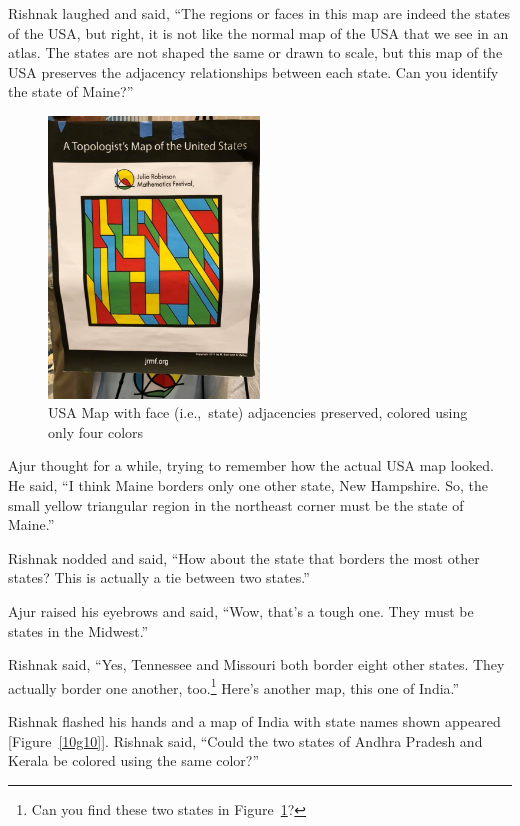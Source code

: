 Rishnak laughed and said, ``The regions or faces in this map are indeed the states of the USA, but right, it is not like the normal map of the USA that we see in an atlas. The states are not shaped the same or drawn to scale, but this map of the USA preserves the adjacency relationships between each state. Can you identify the state of Maine?''

\begin{figure}
\begin{center}
\includegraphics[width=0.5\textwidth]{usamap.png}
\end{center}
\caption{USA Map with face (i.e.,~state) adjacencies preserved, colored using only four colors}\label{10g9}
\end{figure}

Ajur thought for a while, trying to remember how the actual USA map looked. He said, ``I think Maine borders only one other state, New Hampshire. So, the small yellow triangular region in the northeast corner must be the state of Maine.''

Rishnak nodded and said, ``How about the state that borders the most other states? This is actually a tie between two states.''

Ajur raised his eyebrows and said, ``Wow, that's a tough one. They must be states in the Midwest.''

Rishnak said, ``Yes, Tennessee and Missouri both border eight other states. They actually border one another, too.\footnote{Can you find these two states in Figure~\ref{10g9}?} Here's another map, this one of India.''

Rishnak flashed his hands and a map of India with state names shown appeared [Figure~\ref{10g10}]. Rishnak said, ``Could the two states of Andhra Pradesh and Kerala be colored using the same color?''

